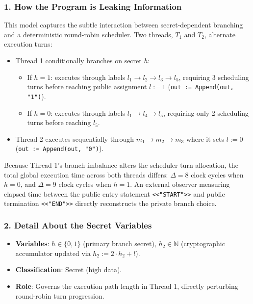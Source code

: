 \documentclass[a4paper,11pt]{article}
\begin{document}
\subsubsection{1. How the Program is Leaking Information}
This model captures the subtle interaction between secret-dependent branching and a deterministic round-robin scheduler. Two threads, $T_1$ and $T_2$, alternate execution turns:
\begin{itemize}
    \item Thread 1 conditionally branches on secret $h$:
    \begin{itemize}
        \item If $h = 1$: executes through labels $l_1 \to l_2 \to l_3 \to l_5$, requiring 3 scheduling turns before reaching public assignment $l := 1$ (\texttt{out := Append(out, "1")}).
        \item If $h = 0$: executes through labels $l_1 \to l_4 \to l_5$, requiring only 2 scheduling turns before reaching $l_5$.
    \end{itemize}
    \item Thread 2 executes sequentially through $m_1 \to m_2 \to m_3$ where it sets $l := 0$ (\texttt{out := Append(out, "0")}).
\end{itemize}
Because Thread 1's branch imbalance alters the scheduler turn allocation, the total global execution time across both threads differs: $\Delta = 8$ clock cycles when $h = 0$, and $\Delta = 9$ clock cycles when $h = 1$. An external observer measuring elapsed time between the public entry statement \texttt{<<"START">>} and public termination \texttt{<<"END">>} directly reconstructs the private branch choice.

\subsubsection{2. Detail About the Secret Variables}
\begin{itemize}
    \item \textbf{Variables}: $h \in \{0, 1\}$ (primary branch secret), $h_2 \in \mathbb{N}$ (cryptographic accumulator updated via $h_2 := 2 \cdot h_2 + l$).
    \item \textbf{Classification}: Secret (high data).
    \item \textbf{Role}: Governs the execution path length in Thread 1, directly perturbing round-robin turn progression.
\end{itemize}
\end{document}
